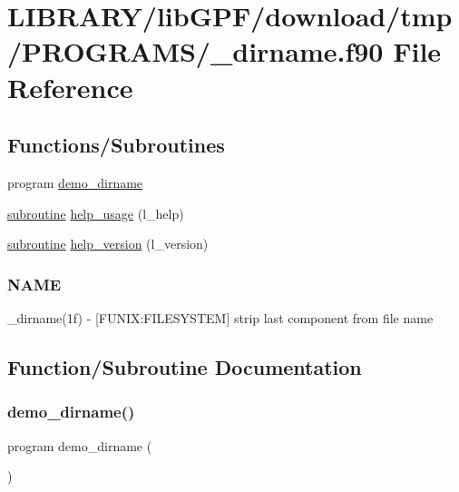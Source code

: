 \hypertarget{__dirname_8f90}{}\section{L\+I\+B\+R\+A\+R\+Y/lib\+G\+P\+F/download/tmp/\+P\+R\+O\+G\+R\+A\+M\+S/\+\_\+dirname.f90 File Reference}
\label{__dirname_8f90}
\subsection*{Functions/\+Subroutines}
\begin{DoxyCompactItemize}
\item 
program \hyperlink{__dirname_8f90_ad38fdec955ba9814439d9492698fd8c4}{demo\+\_\+dirname}
\item 
\hyperlink{M__stopwatch_83_8txt_acfbcff50169d691ff02d4a123ed70482}{subroutine} \hyperlink{__dirname_8f90_a3d60364463c9076e431b8d8c043cbd1c}{help\+\_\+usage} (l\+\_\+help)
\item 
\hyperlink{M__stopwatch_83_8txt_acfbcff50169d691ff02d4a123ed70482}{subroutine} \hyperlink{__dirname_8f90_a948f25e883089a17879425d9c31c64cd}{help\+\_\+version} (l\+\_\+version)
\begin{DoxyCompactList}\small\item\em \subsubsection*{N\+A\+ME}

\+\_\+dirname(1f) -\/ \mbox{[}F\+U\+N\+IX\+:F\+I\+L\+E\+S\+Y\+S\+T\+EM\mbox{]} strip last component from file name \end{DoxyCompactList}\end{DoxyCompactItemize}


\subsection{Function/\+Subroutine Documentation}
\mbox{\label{__dirname_8f90_ad38fdec955ba9814439d9492698fd8c4}} 
\subsubsection{\texorpdfstring{demo\+\_\+dirname()}{demo\_dirname()}}
{\footnotesize\ttfamily program demo\+\_\+dirname (\begin{DoxyParamCaption}{ }\end{DoxyParamCaption})}



